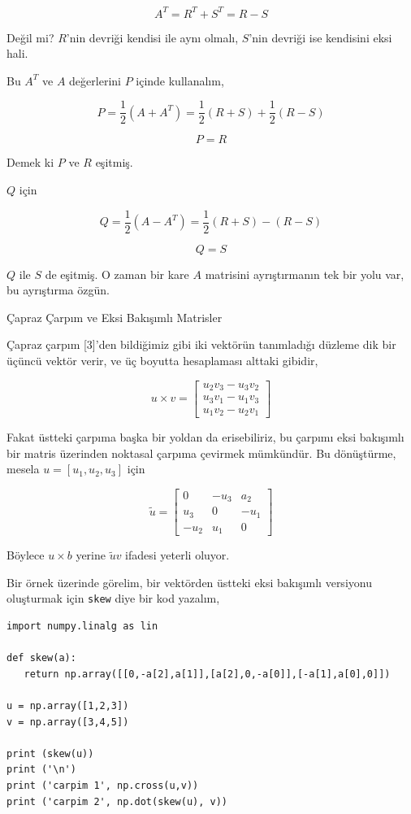\documentclass[12pt,fleqn]{article}\usepackage{../../common}
\begin{document}
$$
A^T = R^T + S^T = R - S
$$

Değil mi? $R$'nin devriği kendisi ile aynı olmalı, $S$'nin devriği ise
kendisini eksi hali.

Bu $A^T$ ve $A$ değerlerini $P$ içinde kullanalım,

$$
P = \frac{1}{2} (A + A^T) = \frac{1}{2} (R + S) + \frac{1}{2} (R - S)
$$

$$
P = R
$$

Demek ki $P$ ve $R$ eşitmiş.

$Q$ için

$$
Q = \frac{1}{2} (A-A^T) = \frac{1}{2} (R+S) - (R-S) 
$$

$$
Q = S
$$

$Q$ ile $S$ de eşitmiş. O zaman bir kare $A$ matrisini ayrıştırmanın tek bir
yolu var, bu ayrıştırma özgün.

Çapraz Çarpım ve Eksi Bakışımlı Matrisler

Çapraz çarpım [3]'den bildiğimiz gibi iki vektörün tanımladığı düzleme dik bir
üçüncü vektör verir, ve üç boyutta hesaplaması alttaki gibidir,

$$ 
u \times v = 
\left[\begin{array}{r}
u_2v_3 - u_3v_2 \\
u_3v_1 - u_1v_3 \\
u_1v_2 - u_2v_1 
\end{array}\right]
$$

Fakat üstteki çarpıma başka bir yoldan da erisebiliriz, bu çarpımı eksi
bakışımlı bir matris üzerinden noktasal çarpıma çevirmek mümkündür. Bu
dönüştürme, mesela $u = [u_1, u_2, u_3]$ için

$$
\tilde u =
\left[\begin{array}{ccc}
0 & -u_3 & a_2 \\
u_3 & 0 & -u_1 \\
-u_2 & u_1 & 0
\end{array}\right]
$$

Böylece $u \times b$ yerine $\tilde u v$ ifadesi yeterli oluyor.

Bir örnek üzerinde görelim, bir vektörden üstteki eksi bakışımlı versiyonu
oluşturmak için \verb!skew! diye bir kod yazalım,

\begin{verbatim}
import numpy.linalg as lin
  
def skew(a):
   return np.array([[0,-a[2],a[1]],[a[2],0,-a[0]],[-a[1],a[0],0]])

u = np.array([1,2,3])
v = np.array([3,4,5])

print (skew(u))
print ('\n')
print ('carpim 1', np.cross(u,v))
print ('carpim 2', np.dot(skew(u), v))
\end{verbatim}
\end{document}
